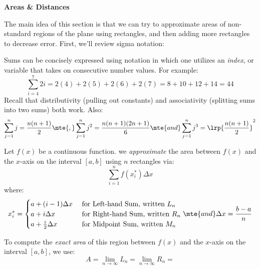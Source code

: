 
\chead{\today}
\graphicspath{ {\string~/Desktop} }
\usetikzlibrary{arrows}
\newcommand{\ans}[1]{\noindent {\color{red} \textbf{Answer:} #1}}
\renewcommand{\ans}[1]{\vspace{3in}}



\begin{center}
\textbf{Areas \& Distances}
\end{center}

The main idea of this section is that we can try to approximate areas of non-standard regions of the plane using rectangles, and then adding more rectangles to decrease error. First, we'll review sigma notation:

\begin{aun}
Sums can be concisely expressed using notation in which one utilizes an \emph{index}, or variable that takes on consecutive number values. For example:
\[
\sum_{i = 4}^7 2i = 2(4) + 2(5) + 2(6) + 2(7) = 8 + 10 + 12 + 14 = 44
\]
Recall that distributivity (pulling out constants) and associativity (splitting sums into two sums) both work. Also:
\[
\sum_{j= 1}^n j = \frac{n (n+1)}{2} \mte{,} \sum_{j = 1} ^ {n} j^2 = \frac{n (n+1)(2n+1)}{6} \mte{ and } \sum_{j= 1}^n j^3 = \lrp{\frac{n (n+1)}{2}}^2
\]
\end{aun}

\begin{defi}
Let $f(x)$ be a continuous function. we \emph{approximate} the area between $f(x)$ and the $x$-axis on the interval $[a,b]$ using $n$ rectangles via:
\[
\sum_{i = 1}^n f(x_i^*) \Delta x 
\]
where:
\[
x_i^* = \begin{cases}
a + (i-1) \Delta x & \text{ for Left-hand Sum, written } L_n\\
a + i \Delta x & \text{ for Right-hand Sum, written } R_n\\
a + \frac{i}{2} \Delta x & \text{ for Midpoint Sum, written } M_n\\
\end{cases}
\mte{ and } \Delta x = \frac{b - a}{n}
\]
\end{defi}
\begin{defi}
To compute the \emph{exact area} of this region between $f(x)$ and the $x$-axis on the interval $[a,b]$, we use:
\[
A = \lim_{n \to \infty} L_n =  \lim_{n \to \infty} R_n = 
\]
\end{defi}


